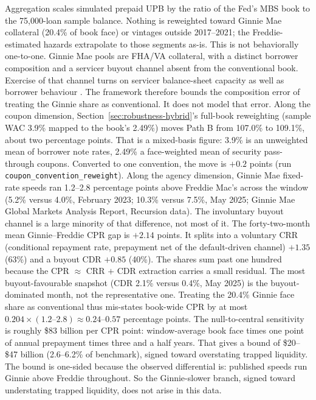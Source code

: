 \documentclass[12pt]{article}
\begin{document}
Aggregation scales simulated prepaid UPB by the ratio of the Fed's MBS book to the 75,000-loan sample balance. Nothing is reweighted toward Ginnie Mae collateral (20.4\% of book face) or vintages outside 2017--2021; the Freddie-estimated hazards extrapolate to those segments as-is. This is not behaviorally one-to-one. Ginnie Mae pools are FHA/VA collateral, with a distinct borrower composition and a servicer buyout channel absent from the conventional book. Exercise of that channel turns on servicer balance-sheet capacity as well as borrower behaviour \citep{aiello2022}. The framework therefore bounds the composition error of treating the Ginnie share as conventional. It does not model that error. Along the coupon dimension, Section~\ref{sec:robustness-hybrid}'s full-book reweighting (sample WAC 3.9\% mapped to the book's 2.49\%) moves Path B from 107.0\% to 109.1\%, about two percentage points. That is a mixed-basis figure: 3.9\% is an unweighted mean of borrower note rates, 2.49\% a face-weighted mean of security pass-through coupons. Converted to one convention, the move is $+0.2$ points (run \texttt{coupon\_convention\_reweight}). Along the agency dimension, Ginnie Mae fixed-rate speeds ran 1.2--2.8 percentage points above Freddie Mac's across the window (5.2\% versus 4.0\%, February 2023; 10.3\% versus 7.5\%, May 2025; Ginnie Mae Global Markets Analysis Report, Recursion data). The involuntary buyout channel is a large minority of that difference, not most of it. The forty-two-month mean Ginnie--Freddie CPR gap is $+2.14$ points. It splits into a voluntary CRR (conditional repayment rate, prepayment net of the default-driven channel) $+1.35$ (63\%) and a buyout CDR $+0.85$ (40\%). The shares sum past one hundred because the CPR $\approx$ CRR $+$ CDR extraction carries a small residual. The most buyout-favourable snapshot (CDR 2.1\% versus 0.4\%, May 2025) is the buyout-dominated month, not the representative one. Treating the 20.4\% Ginnie face share as conventional thus mis-states book-wide CPR by at most $0.204 \times (1.2\text{--}2.8) \approx 0.24$--$0.57$ percentage points. The null-to-central sensitivity is roughly \$83 billion per CPR point: window-average book face times one point of annual prepayment times three and a half years. That gives a bound of \$20--\$47 billion (2.6--6.2\% of benchmark), signed toward overstating trapped liquidity. The bound is one-sided because the observed differential is: published speeds run Ginnie above Freddie throughout. So the Ginnie-slower branch, signed toward understating trapped liquidity, does not arise in this data.
\end{document}
